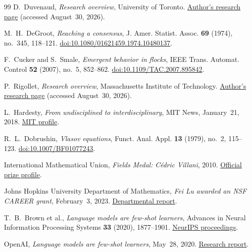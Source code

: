 \documentclass[11pt]{amsart}
\numberwithin{equation}{section}
\theoremstyle{plain}
\begin{document}
\begin{thebibliography}{99}
D.~Duvenaud,
\emph{Research overview}, University of Toronto.
\href{https://www.cs.toronto.edu/~duvenaud/}{Author's research page}
(accessed August~30, 2026).

M.~H.~DeGroot,
\emph{Reaching a consensus},
J. Amer. Statist. Assoc. \textbf{69} (1974), no.~345, 118--121.
\href{https://doi.org/10.1080/01621459.1974.10480137}
{doi:10.1080/01621459.1974.10480137}.

F.~Cucker and S.~Smale,
\emph{Emergent behavior in flocks},
IEEE Trans. Automat. Control \textbf{52} (2007), no.~5, 852--862.
\href{https://doi.org/10.1109/TAC.2007.895842}
{doi:10.1109/TAC.2007.895842}.

P.~Rigollet,
\emph{Research overview}, Massachusetts Institute of Technology.
\href{https://math.mit.edu/~rigollet/index.html}{Author's research page}
(accessed August~30, 2026).

L.~Hardesty,
\emph{From undisciplined to interdisciplinary}, MIT News, January~21, 2018.
\href{https://news.mit.edu/2018/faculty-profile-philippe-rigollet-0122}
{MIT profile}.

R.~L.~Dobrushin,
\emph{Vlasov equations},
Funct. Anal. Appl. \textbf{13} (1979), no.~2, 115--123.
\href{https://doi.org/10.1007/BF01077243}
{doi:10.1007/BF01077243}.

International Mathematical Union,
\emph{Fields Medal: C\'edric Villani}, 2010.
\href{https://www.mathunion.org/fileadmin/IMU/ICM2010/offline/www.icm2010.in/prize-winners-2010/fields-medal-cedric-villani.html}
{Official prize profile}.

Johns Hopkins University Department of Mathematics,
\emph{Fei Lu awarded an NSF CAREER grant}, February~3, 2023.
\href{https://mathematics.jhu.edu/2023/02/03/fei-lu-awarded-an-nsf-career-grant/}
{Departmental report}.

T.~B.~Brown et al.,
\emph{Language models are few-shot learners},
Advances in Neural Information Processing Systems \textbf{33} (2020),
1877--1901.
\href{https://proceedings.neurips.cc/paper_files/paper/2020/hash/1457c0d6bfcb4967418bfb8ac142f64a-Abstract.html}
{NeurIPS proceedings}.

OpenAI,
\emph{Language models are few-shot learners}, May~28, 2020.
\href{https://openai.com/index/language-models-are-few-shot-learners/}
{Research report}.


\end{thebibliography}
\end{document}
